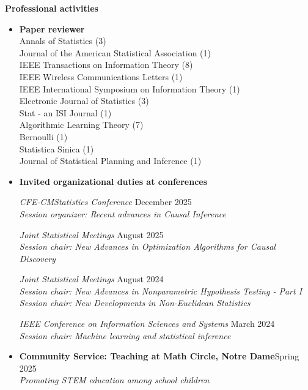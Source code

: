 \documentclass[letterpaper,12pt,oneside]{article}
\theoremstyle{definition}
\begin{document}
			
			\noindent \textbf{Professional activities}
			\begin{itemize}
				\item[]
				{\bf Paper reviewer}\\
				Annals of Statistics (3)\\
				Journal of the American Statistical Association (1)\\
				IEEE Transactions on Information Theory (8)\\
				IEEE Wireless Communications Letters (1)\\
				IEEE International Symposium on Information Theory (1)\\
				Electronic Journal of Statistics (3)\\
				Stat - an ISI Journal (1)\\
				Algorithmic Learning Theory (7)\\
				Bernoulli (1)\\
				Statistica Sinica (1)\\
				Journal of Statistical Planning and Inference (1)
				
				
				\item[] 
				{\bf Invited organizational duties at conferences}
				
				
				
				{\it CFE-CMStatistics Conference} \hfill December 2025\\
				{\it Session organizer: Recent advances in Causal Inference}
				
				{\it Joint Statistical Meetings} \hfill August 2025\\
				{\it Session chair: New Advances in Optimization Algorithms for Causal Discovery}
				
				
				{\it Joint Statistical Meetings} \hfill August 2024\\
				{\it Session chair: New Advances in Nonparametric Hypothesis Testing - Part I}\\
				{\it Session chair: New Developments in Non-Euclidean Statistics}
				
				{\it IEEE Conference on Information Sciences and Systems} \hfill March 2024\\
				{\it  Session chair: Machine learning and statistical inference}
				
				\item[] \textbf{Community Service: Teaching at Math Circle, Notre Dame}\hfill Spring 2025\\
				{\it Promoting STEM education among school children}
				

\end{itemize}
\end{document}
